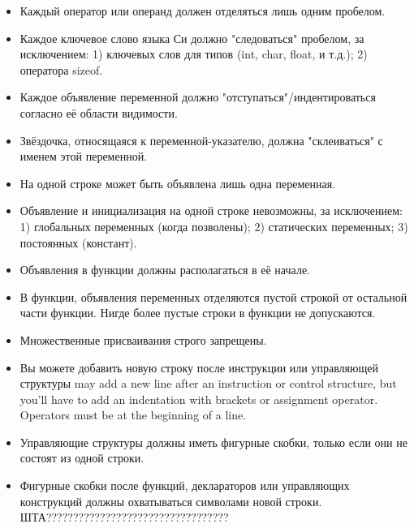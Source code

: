 \documentclass{42-ru}
\begin{document}
\begin{itemize}
                \item Каждый оператор или операнд должен отделяться лишь одним пробелом.

                \item Каждое ключевое слово языка Си должно "следоваться" пробелом, за исключением:
                    1) ключевых слов для типов (int, char, float, и т.д.); 2) оператора sizeof.

                \item Каждое объявление переменной должно "отступаться"/индентироваться согласно её области видимости.

                \item Звёздочка, относящаяся к переменной-указателю, должна "склеиваться" с именем этой переменной.

                \item На одной строке может быть объявлена лишь одна переменная.

                \item Объявление и инициализация на одной строке невозможны, за исключением:
                    1) глобальных переменных (когда позволены); 2) статических переменных; 3) постоянных (констант).

                \item Объявления в функции должны располагаться в её начале.

                \item В функции, объявления переменных отделяются пустой строкой от остальной части функции.
                    Нигде более пустые строки в функции не допускаются.

                \item Множественные присваивания строго запрещены.

                \item Вы можете добавить новую строку после инструкции или управляющей структуры may add a new line after an instruction or
                  control structure, but you'll have to add an
                  indentation with brackets or assignment operator.
                  Operators must be at the beginning of a line.

                \item Управляющие структуры должны иметь фигурные скобки, только если они не состоят из одной строки.

                \item Фигурные скобки после функций, деклараторов или управляющих конструкций должны охватываться символами новой строки.
                    ШТА??????????????????????????????????

            \end{itemize}
\end{document}
